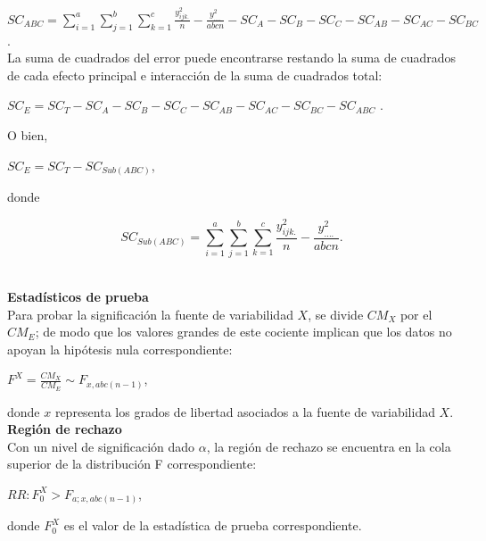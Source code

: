 $ SC_{ABC} =  \sum_{i=1}^{a}  \sum_{j=1}^{b}  \sum_{k=1}^{c}  \frac{y_{ijk.}^{2}}{n}  - \frac{y_{....}^{2}}{abcn} - SC_{A} -SC_{B} - SC_{C} -SC_{AB} -SC_{AC} -SC_{BC}  $ .\\


La suma de cuadrados del error puede encontrarse restando la suma de cuadrados de cada efecto principal e interacción de la suma de cuadrados total:\\

\begin{center}
	$ SC_{E} = SC_{T} -SC_{A} - SC_{B}-SC_{C} -SC_{AB} -SC_{AC} -SC_{BC} -SC_{ABC} $ .\\
\end{center}

O bien, 
\begin{center}
	$ SC_{E} = SC_{T} - SC_{Sub(ABC)} $,\\
\end{center}

donde
\begin{center}
$$ SC_{Sub(ABC)} = \sum_{i=1}^{a}  \sum_{j=1}^{b}  \sum_{k=1}^{c} \frac{y_{ijk.}^{2}}{n} - \frac{y_{....}^{2}}{abcn} .$$\\
\end{center}


\textbf{Estadísticos de prueba}\\

Para probar la significación la fuente de variabilidad $X$, se divide $CM_{X}$ por el  $CM_{E}$; de modo que los valores grandes de este cociente implican que los datos no apoyan la hipótesis nula correspondiente:
\begin{center}
	$ F^{X} = \frac{CM_{X}}{CM_{E}} \sim F_{x,abc(n-1)} $,\\
\end{center}


donde $x$ representa los grados de libertad asociados a la fuente de variabilidad $X$.\\

\textbf{Región de rechazo}\\

Con un nivel de significación dado $\alpha$, la región de rechazo se encuentra en la cola superior de la distribución F correspondiente:

\begin{center}
	$ RR : F_{0}^{X} > F_{a;x,abc(n-1)} $,\\
\end{center}

donde $F_{0}^{X} $ es el valor de la estadística de prueba correspondiente.\\

